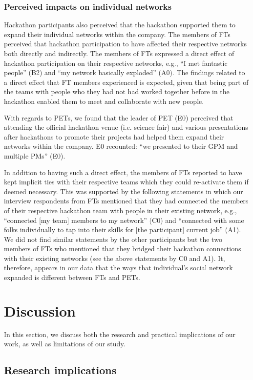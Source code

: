 \documentclass{hcij}
\begin{document}
\subsubsection{Perceived impacts on individual networks}
Hackathon participants also perceived that the hackathon supported them to expand their individual networks within the company. The members of FTs perceived that hackathon participation to have affected their respective networks both directly and indirectly. The members of FTs expressed a direct effect of hackathon participation on their respective networks, e.g., “I met fantastic people” (B2) and “my network basically exploded” (A0). The findings related to a direct effect that FT members experienced is expected, given that being part of the teams with people who they had not had worked together before in the hackathon enabled them to meet and collaborate with new people.

With regards to PETs, we found that the leader of PET (E0) perceived that attending the official hackathon venue (i.e. science fair) and various presentations after hackathons to promote their projects had helped them expand their networks within the company. E0 recounted: “we presented to their GPM and multiple PMs” (E0).

In addition to having such a direct effect, the members of FTs reported to have kept implicit ties with their respective teams which they could re-activate them if deemed necessary. This was supported by the following statements in which our interview respondents from FTs mentioned that they had connected the members of their respective hackathon team with people in their existing network, e.g., “connected [my team] members to my network” (C0) and “connected with some folks individually to tap into their skills for [the participant] current job” (A1). We did not find similar statements by the other participants but the two members of FTs who mentioned that they bridged their hackathon connections with their existing networks (see the above statements by C0 and A1). It, therefore, appears in our data that the ways that individual’s social network expanded is different between FTs and PETs.

\section{Discussion}
In this section, we discuss both the research and practical implications of our work, as well as limitations of our study.

\subsection{Research implications}
\end{document}

